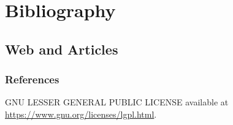 \section{Bibliography}
\subsection*{Web and Articles}

\begin{frame}[allowframebreaks]
  \frametitle<presentation>{References}
     
  \begin{thebibliography}{10}
      GNU LESSER GENERAL PUBLIC LICENSE
      \newblock available at \url{https://www.gnu.org/licenses/lgpl.html}.
  \end{thebibliography}
\end{frame}